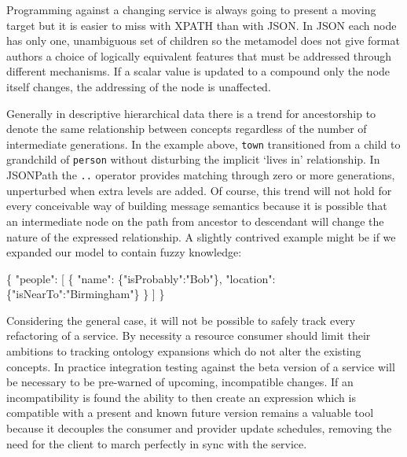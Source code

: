 \documentclass[12pt, ]{article}
\newenvironment{Shaded}{}{}
\newcommand{\StringTok}[1]{\textcolor[rgb]{0.25,0.44,0.63}{{#1}}}
\newcommand{\NormalTok}[1]{{#1}}
\begin{document}
Programming against a changing service is always going to present a
moving target but it is easier to miss with XPATH than with JSON. In
JSON each node has only one, unambiguous set of children so the
metamodel does not give format authors a choice of logically equivalent
features that must be addressed through different mechanisms. If a
scalar value is updated to a compound only the node itself changes, the
addressing of the node is unaffected.

Generally in descriptive hierarchical data there is a trend for
ancestorship to denote the same relationship between concepts regardless
of the number of intermediate generations. In the example above,
\texttt{town} transitioned from a child to grandchild of \texttt{person}
without disturbing the implicit `lives in' relationship. In JSONPath the
\texttt{..} operator provides matching through zero or more generations,
unperturbed when extra levels are added. Of course, this trend will not
hold for every conceivable way of building message semantics because it
is possible that an intermediate node on the path from ancestor to
descendant will change the nature of the expressed relationship. A
slightly contrived example might be if we expanded our model to contain
fuzzy knowledge:

\begin{Shaded}
\begin{Highlighting}[]
\NormalTok{\{}
   \StringTok{"people"}\NormalTok{: [}
      \NormalTok{\{  }
         \StringTok{"name"}\NormalTok{:     \{}\StringTok{"isProbably"}\NormalTok{:}\StringTok{"Bob"}\NormalTok{\},}
         \StringTok{"location"}\NormalTok{: \{}\StringTok{"isNearTo"}\NormalTok{:}\StringTok{"Birmingham"}\NormalTok{\}}
      \NormalTok{\}}
   \NormalTok{]   }
\NormalTok{\}}
\end{Highlighting}
\end{Shaded}

Considering the general case, it will not be possible to safely track
every refactoring of a service. By necessity a resource consumer should
limit their ambitions to tracking ontology expansions which do not alter
the existing concepts. In practice integration testing against the beta
version of a service will be necessary to be pre-warned of upcoming,
incompatible changes. If an incompatibility is found the ability to then
create an expression which is compatible with a present and known future
version remains a valuable tool because it decouples the consumer and
provider update schedules, removing the need for the client to march
perfectly in sync with the service.
\end{document}
